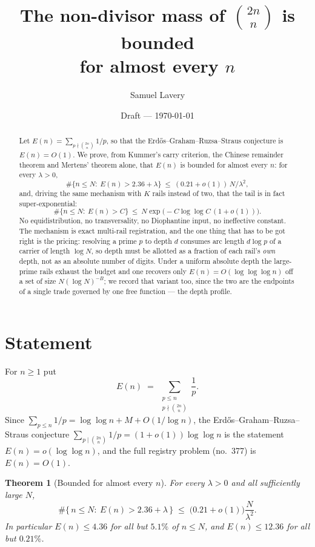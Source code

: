 \documentclass[11pt]{article}
\title{The non-divisor mass of $\binom{2n}{n}$ is bounded\\
for almost every $n$}
\author{Samuel Lavery}
\date{Draft --- \today}
\newtheorem{theorem}{Theorem}
\begin{document}
\maketitle

\begin{abstract}
Let $E(n)=\sum_{p\nmid\binom{2n}{n}}1/p$, so that the Erd\H{o}s--Graham--Ruzsa--Straus
conjecture is $E(n)=O(1)$.  We prove, from Kummer's carry criterion, the Chinese
remainder theorem and Mertens' theorem alone, that $E(n)$ is bounded for almost every
$n$: for every $\lambda>0$,
\[
\#\{n\le N:\ E(n)>2.36+\lambda\}\ \le\ (0.21+o(1))\,N/\lambda^{2},
\]
and, driving the same mechanism with $K$ rails instead of two, that the tail is in fact
super-exponential:
\[
\#\{n\le N:\ E(n)>C\}\ \le\ N\exp\bigl(-C\log\log C\,(1+o(1))\bigr).
\]
No equidistribution, no transversality, no Diophantine input, no ineffective constant.
The mechanism is exact multi-rail registration, and the one thing that has to be got
right is the pricing: resolving a prime $p$ to depth $d$ consumes arc length $d\log p$
of a carrier of length $\log N$, so depth must be allotted as a fraction of each rail's
\emph{own} depth, not as an absolute number of digits.  Under a uniform absolute depth
the large-prime rails exhaust the budget and one recovers only
$E(n)=O(\log\log\log n)$ off a set of size $N(\log N)^{-B}$; we record that variant too,
since the two are the endpoints of a single trade governed by one free function --- the
depth profile.
\end{abstract}

\section{Statement}

For $n\ge1$ put
\[
E(n)\;=\;\sum_{\substack{p\le n\\ p\nmid\binom{2n}{n}}}\frac1p .
\]
Since $\sum_{p\le n}1/p=\log\log n+M+O(1/\log n)$, the Erd\H{o}s--Graham--Ruzsa--Straus
conjecture $\sum_{p\mid\binom{2n}{n}}1/p=(1+o(1))\log\log n$ is the statement
$E(n)=o(\log\log n)$, and the full registry problem (no.~377) is $E(n)=O(1)$.

\begin{theorem}[Bounded for almost every $n$]\label{thm:A}
For every $\lambda>0$ and all sufficiently large $N$,
\[
\#\bigl\{\,n\le N:\ E(n)>2.36+\lambda\,\bigr\}\;\le\;\bigl(0.21+o(1)\bigr)\frac{N}{\lambda^{2}} .
\]
In particular $E(n)\le4.36$ for all but $5.1\%$ of $n\le N$, and $E(n)\le12.36$ for all
but $0.21\%$.
\end{theorem}
\end{document}
